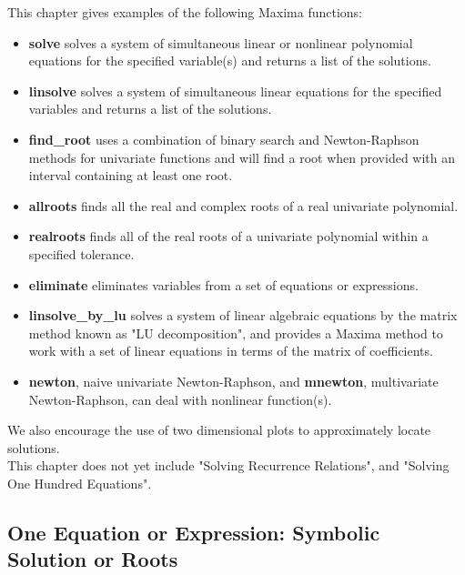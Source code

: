 \documentclass[12pt]{article}
\begin{document}
This chapter gives examples of the following Maxima functions:
\begin{itemize}
\item \textbf{solve} solves a system of simultaneous linear or nonlinear polynomial equations
  for the specified variable(s) and returns a list of the solutions.
\item  \textbf{linsolve} solves a system of simultaneous linear equations for the specified
   variables and returns a list of the solutions.
\item   \textbf{find\_root} uses a combination of binary search and Newton-Raphson methods
   for univariate functions and will find a root when provided with an interval containing at least
   one root.
\item   \textbf{allroots} finds all the real and complex roots of a real univariate polynomial.
\item   \textbf{realroots} finds all of the real roots of a univariate polynomial
   within a specified tolerance.
\item  \textbf{eliminate} eliminates variables from a set of equations or expressions.
\item \textbf{linsolve\_by\_lu} solves a system of linear algebraic equations by the matrix
   method known as "LU decomposition", and provides a Maxima method to work with a set
   of linear equations in terms of the matrix of coefficients.
\item \textbf{newton}, naive univariate Newton-Raphson, and \textbf{mnewton}, multivariate Newton-Raphson,
   can deal with nonlinear function(s).
\end{itemize}
We also encourage the use of two dimensional plots to approximately locate solutions.\\
   
This chapter does not yet include "Solving  Recurrence Relations", and 
  "Solving One Hundred Equations".

\subsection{One Equation or Expression: Symbolic Solution or Roots}
\end{document}
